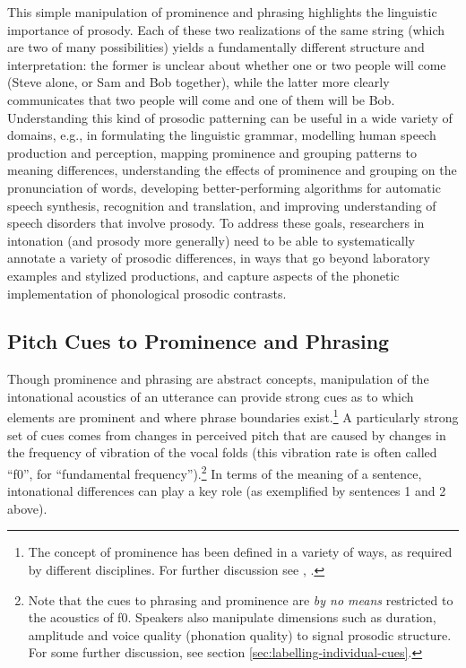 This simple manipulation of prominence and phrasing highlights the linguistic importance of prosody. Each of these two realizations of the same string (which are two of many possibilities) yields a fundamentally different structure and interpretation: the former is unclear about whether one or two people will come (Steve alone, or Sam and Bob together), while the latter more clearly communicates that two people will come and one of them will be Bob. Understanding this kind of prosodic patterning can be useful in a wide variety of domains, e.g., in formulating the linguistic grammar, modelling human speech production and perception, mapping prominence and grouping patterns to meaning differences, understanding the effects of prominence and grouping on the pronunciation of words, developing better-performing algorithms for automatic speech synthesis, recognition and translation, and improving understanding of speech disorders that involve prosody. To address these goals, researchers in intonation (and prosody more generally) need to be able to systematically annotate a variety of prosodic differences, in ways that go beyond laboratory examples and stylized productions, and capture aspects of the phonetic implementation of phonological prosodic contrasts.

\subsection{Pitch Cues to Prominence and Phrasing}\label{sec:pitch-cues-to-prominence-and-phrasing}

Though prominence and phrasing are abstract concepts, manipulation of the intonational acoustics of an utterance can provide strong cues as to which elements are prominent and where phrase boundaries exist.\footnote{The concept of prominence has been defined in a variety of ways, as required by different disciplines. For further discussion see \citealt{gussenhoven15}, \citealt{wagner-15}.} A particularly strong set of cues comes from changes in perceived pitch that are caused by changes in the frequency of vibration of the vocal folds (this vibration rate is often called “f0”, for “fundamental frequency”).\footnote{Note that the cues to phrasing and prominence are \textit{by no means} restricted to the acoustics of f0.  Speakers also manipulate dimensions such as duration, amplitude and voice quality (phonation quality) to signal prosodic structure. For some further discussion, see section \ref{sec:labelling-individual-cues}.} In terms of the meaning of a sentence, intonational differences can play a key role (as exemplified by sentences 1 and 2 above).

